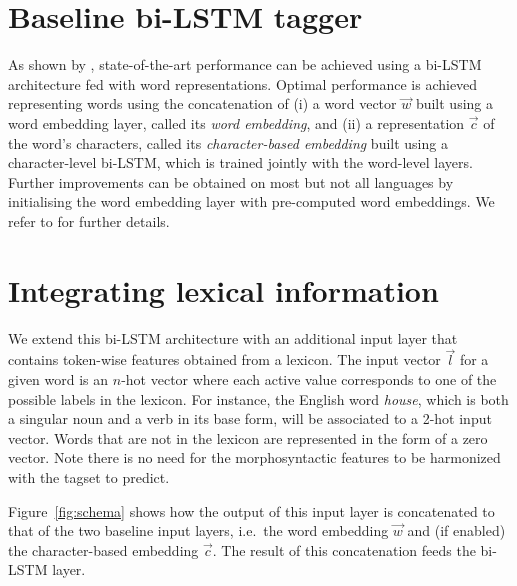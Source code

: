 \documentclass[11pt,a4paper]{article}
\begin{document}
\section{Baseline bi-LSTM tagger}
\label{sec:baselinearchitecture}
As shown by \citet{plank16}, state-of-the-art performance can be achieved using a bi-LSTM architecture fed with word
representations. Optimal performance is achieved representing words using the concatenation of (i) a word vector
$\vec{w}$ built using a word embedding layer, called its {\em word embedding}, and (ii) a representation $\vec{c}$ of
the word's characters, called its {\em character-based embedding} built using a character-level bi-LSTM, which is
trained jointly with the word-level layers. Further improvements can be obtained on most but not all languages by
initialising the word embedding layer with pre-computed word embeddings. We refer to \citet{plank16} for further details.

\section{Integrating lexical information}

We extend this bi-LSTM architecture with an additional input layer that contains token-wise features obtained from a
lexicon. The input vector $\vec{l}$ for a given word is an $n$-hot vector where each active value corresponds to one of
the possible labels in the lexicon. For instance, the English word \textit{house}, which is both a singular noun and a
verb in its base form, will be associated to a 2-hot input vector. Words that are not in the lexicon are represented in
the form of a zero vector. Note there is no need for the morphosyntactic features to be harmonized with the tagset to
predict.

Figure~\ref{fig:schema} shows how the output of this input layer is concatenated to that of the two baseline input
layers, i.e.~the word embedding $\vec{w}$ and (if enabled) the character-based embedding $\vec{c}$. The result of this
concatenation feeds the bi-LSTM layer.

\end{document}
